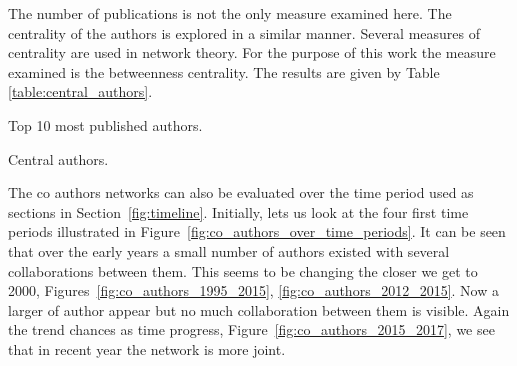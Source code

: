 \documentclass{article}
\begin{document}
The number of publications is not the only measure examined here. The
centrality of the authors is explored in a similar manner. Several measures of
centrality are used in network theory. For the purpose of this work the measure 
examined is the betweenness centrality. The results are given by Table
\ref{table:central_authors}.

\begin{table}[!hbtp]
    \begin{center}
    
    \end{center}
    \caption{Top 10 most published authors.}
    \label{table:most_published}
\end{table}

\begin{table}[!hbtp]
    \begin{center}
    
    \end{center}
    \caption{Central authors.}
    \label{table:central_authors}
\end{table}

The co authors networks can also be evaluated over the time period used as 
sections in Section~\ref{fig:timeline}. Initially, lets us look at the four first
time periods illustrated in Figure~\ref{fig:co_authors_over_time_periods}.
It can be seen that over the early years a small number of authors existed with
several collaborations between them. This seems to be changing the closer we 
get to 2000, Figures~\ref{fig:co_authors_1995_2015}, \ref{fig:co_authors_2012_2015}.
Now a larger of author appear but no much collaboration between them is visible.
Again the trend chances as time progress, Figure~\ref{fig:co_authors_2015_2017},
we see that in recent year the network is more joint. 
\end{document}
